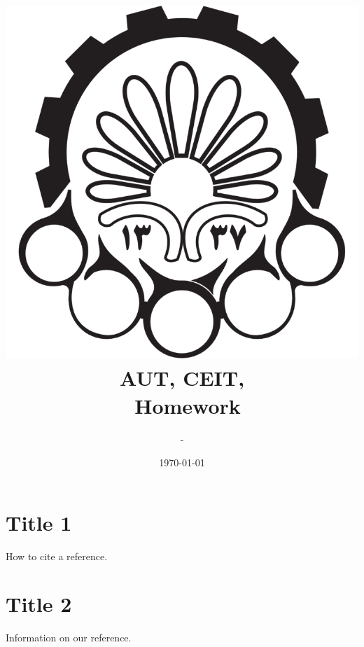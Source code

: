 \documentclass[a4paper]{article}
\title{
	\includegraphics{aut-logo.png}\\
	AUT, CEIT, \course \\
	\numofhw\ Homework
}
\author{\writer\ -\ \stdnum}
\date{\today}
\begin{document}
	
	\maketitle
	\thispagestyle{empty}
	\tableofcontents
	\pagebreak
	

\section{Title 1}

How to cite a reference. \cite{refrence-label}

\section{Title 2}

\begin{thebibliography}{99}
	
	Information on our reference.
	
\end{thebibliography}
\end{document}

